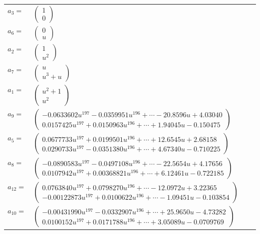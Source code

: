 \documentclass[1p]{elsarticle_modified}
\theoremstyle{definition}
\begin{document}
\begin{tabular}{m{7pt} m{180pt} m{7pt} m{180pt} }
\flushright $a_{3}=$&$\begin{pmatrix}1\\0\end{pmatrix}$ \\
\flushright $a_{6}=$&$\begin{pmatrix}0\\u\end{pmatrix}$ \\
\flushright $a_{2}=$&$\begin{pmatrix}1\\u^2\end{pmatrix}$ \\
\flushright $a_{7}=$&$\begin{pmatrix}u\\u^3+u\end{pmatrix}$ \\
\flushright $a_{1}=$&$\begin{pmatrix}u^2+1\\u^2\end{pmatrix}$ \\
\flushright $a_{9}=$&$\begin{pmatrix}-0.0633602 u^{197}-0.0359951 u^{196}+\cdots-20.8596 u+4.03040\\0.0157425 u^{197}+0.0150963 u^{196}+\cdots+1.94045 u-0.150475\end{pmatrix}$ \\
\flushright $a_{5}=$&$\begin{pmatrix}0.0677733 u^{197}+0.0199501 u^{196}+\cdots+12.6545 u+2.68158\\0.0290733 u^{197}-0.0351380 u^{196}+\cdots+4.67340 u-0.710225\end{pmatrix}$ \\
\flushright $a_{8}=$&$\begin{pmatrix}-0.0890583 u^{197}-0.0497108 u^{196}+\cdots-22.5654 u+4.17656\\0.0107942 u^{197}+0.00368821 u^{196}+\cdots+6.12461 u-0.722185\end{pmatrix}$ \\
\flushright $a_{12}=$&$\begin{pmatrix}0.0763840 u^{197}+0.0798270 u^{196}+\cdots-12.0972 u+3.22365\\-0.00122873 u^{197}+0.0100622 u^{196}+\cdots-1.09451 u-0.103854\end{pmatrix}$ \\
\flushright $a_{10}=$&$\begin{pmatrix}-0.00431990 u^{197}-0.0332907 u^{196}+\cdots+25.9650 u-4.73282\\0.0100152 u^{197}+0.0171788 u^{196}+\cdots+3.05089 u-0.0709769\end{pmatrix}$ \\

\end{tabular}
\end{document}
